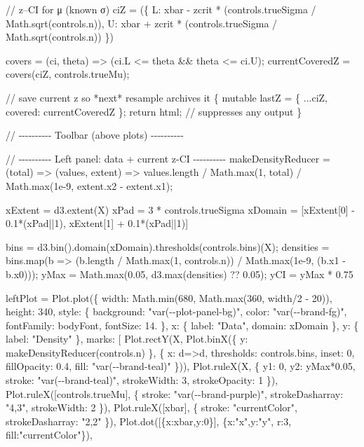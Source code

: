\documentclass[
  letterpaper,
  DIV=11,
  numbers=noendperiod]{scrreprt}
\newenvironment{Shaded}{\begin{snugshade}}{\end{snugshade}}
\newcommand{\NormalTok}[1]{\textcolor[rgb]{0.00,0.23,0.31}{#1}}
\theoremstyle{definition}
\theoremstyle{plain}
\theoremstyle{definition}
\theoremstyle{remark}
\begin{document}
\begin{Shaded}
\begin{Highlighting}[]
\NormalTok{// z–CI for μ (known σ)}
\NormalTok{ciZ = (\{}
\NormalTok{  L: xbar {-} zcrit * (controls.trueSigma / Math.sqrt(controls.n)),}
\NormalTok{  U: xbar + zcrit * (controls.trueSigma / Math.sqrt(controls.n))}
\NormalTok{\})}

\NormalTok{covers = (ci, theta) =\textgreater{} (ci.L \textless{}= theta \&\& theta \textless{}= ci.U);}
\NormalTok{currentCoveredZ = covers(ciZ, controls.trueMu);}

\NormalTok{// save current z so *next* resample archives it}
\NormalTok{\{}
\NormalTok{  mutable lastZ = \{ ...ciZ, covered: currentCoveredZ \};}
\NormalTok{  return html\textasciigrave{}\textasciigrave{}; // suppresses any output}
\NormalTok{\}}


\NormalTok{// {-}{-}{-}{-}{-}{-}{-}{-}{-}{-} Toolbar (above plots) {-}{-}{-}{-}{-}{-}{-}{-}{-}{-}}

\NormalTok{// {-}{-}{-}{-}{-}{-}{-}{-}{-}{-} Left panel: data + current z{-}CI {-}{-}{-}{-}{-}{-}{-}{-}{-}{-}}
\NormalTok{makeDensityReducer = (total) =\textgreater{} (values, extent) =\textgreater{}}
\NormalTok{  values.length / Math.max(1, total) / Math.max(1e{-}9, extent.x2 {-} extent.x1);}

\NormalTok{xExtent = d3.extent(X)}
\NormalTok{xPad    = 3 * controls.trueSigma}
\NormalTok{xDomain = [xExtent[0] {-} 0.1*(xPad||1), xExtent[1] + 0.1*(xPad||1)]}

\NormalTok{bins = d3.bin().domain(xDomain).thresholds(controls.bins)(X);}
\NormalTok{densities = bins.map(b =\textgreater{} (b.length / Math.max(1, controls.n)) / Math.max(1e{-}9, (b.x1 {-} b.x0)));}
\NormalTok{yMax = Math.max(0.05, d3.max(densities) ?? 0.05);}
\NormalTok{yCI  = yMax * 0.75}

\NormalTok{leftPlot = Plot.plot(\{}
\NormalTok{  width: Math.min(680, Math.max(360, width/2 {-} 20)),}
\NormalTok{  height: 340,}
\NormalTok{  style: \{ background: "var({-}{-}plot{-}panel{-}bg)",}
\NormalTok{           color: "var({-}{-}brand{-}fg)",}
\NormalTok{           fontFamily: bodyFont, }
\NormalTok{           fontSize: 14.}
\NormalTok{  \}, }
\NormalTok{  x: \{ label: "Data", domain: xDomain \},}
\NormalTok{  y: \{ label: "Density" \},}
\NormalTok{  marks: [}
\NormalTok{    Plot.rectY(X, Plot.binX(\{ y: makeDensityReducer(controls.n) \}, \{ x: d=\textgreater{}d, thresholds: controls.bins, inset: 0, fillOpacity: 0.4, fill: "var({-}{-}brand{-}teal)" \})),}
\NormalTok{    Plot.ruleX(X, \{ y1: 0, y2: yMax*0.05, stroke: "var({-}{-}brand{-}teal)", strokeWidth: 3, strokeOpacity: 1 \}),}
\NormalTok{    Plot.ruleX([controls.trueMu], \{ stroke: "var({-}{-}brand{-}purple)", strokeDasharray: "4,3", strokeWidth: 2 \}),}
\NormalTok{    Plot.ruleX([xbar], \{ stroke: "currentColor", strokeDasharray: "2,2" \}),}
\NormalTok{    Plot.dot([\{x:xbar,y:0\}], \{x:"x",y:"y", r:3, fill:"currentColor"\}),}


\end{Highlighting}
\end{Shaded}
\end{document}
